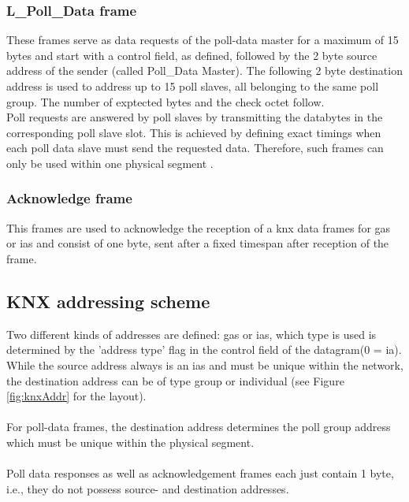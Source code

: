 \subsubsection{L\_Poll\_Data frame}\label{sec:pollDataFrame}

These frames serve as data requests of the poll-data master for a maximum of 15 bytes
and start with a control field, as defined, followed by the 2 byte source address
of the sender (called Poll\_Data Master). The following 2 byte destination address is 
used to address up to 15 poll slaves, all belonging to the same poll group. The number of
exptected bytes and the check octet follow.
\\
Poll requests are answered by poll slaves by transmitting the databytes in the corresponding poll slave slot.
This is achieved by defining exact timings when each poll data slave must send the requested data. Therefore, such frames can only be used within
one physical segment \cite{knxTP1}.

\subsubsection{Acknowledge frame}\label{sec:ackFrame}

This frames are used to acknowledge the reception of a \gls{knx} data frames for \glspl{ga} or \glspl{ia} and consist
of one byte, sent after a fixed timespan after reception of the frame.

\subsection{KNX addressing scheme}

Two different kinds of addresses are defined: \glspl{ga} or \glspl{ia}, which type is used is determined by the 'address type' flag in the
control field of the datagram(0 = \gls{ia}). While the source address always is an \glspl{ia} and must be unique
within the network, the destination address can be of type group or individual (see Figure \ref{fig:knxAddr} for the layout).
\\
\\
For poll-data frames, the destination address determines the poll group address which must be unique within the physical segment.
\\
\\
Poll data responses as well as acknowledgement frames each just contain 1 byte, i.e., they do not possess source- and destination addresses.


